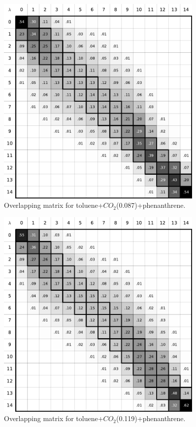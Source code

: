 \documentclass[
	12pt,				%
	openright,			%
	oneside,			%
	a4paper,			%
	english,			%
	brazil				%
	]{abntex2}
\begin{document}
\begin{apendicesenv}
\begin{figure}[H]
	\centering
	\includegraphics[width=0.9\textwidth]{Figures/otolco2_1}
	\caption{Overlapping matrix for toluene+$CO_{2}$(0.087)+phenanthrene.}
\end{figure}
\begin{figure}[H]
	\centering
	\includegraphics[width=0.9\textwidth]{Figures/otolco2_2}
	\caption{Overlapping matrix for toluene+$CO_{2}$(0.119)+phenanthrene.}
\end{figure}


\end{apendicesenv}
\end{document}
